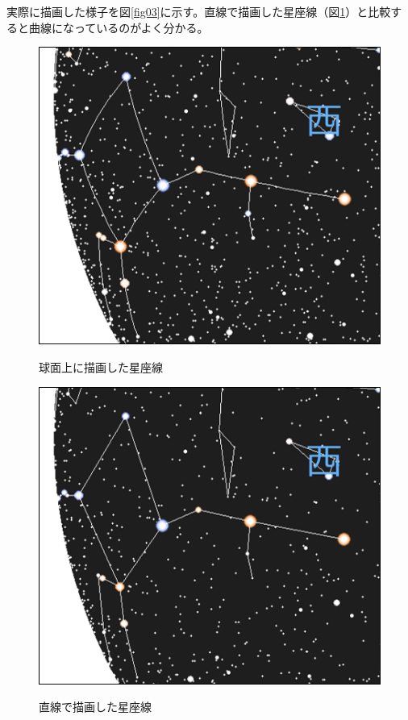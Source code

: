 \documentclass[../main]{subfiles}
\begin{document}
実際に描画した様子を図\ref{fig03}に示す。直線で描画した星座線（図\ref{fig04}）と比較すると曲線になっているのがよく分かる。
\begin{figure}[H]
  \centering
  \begin{minipage}[b]{0.45\linewidth}
    \centering
    \label{fig03}
    \includegraphics[scale=0.6]{sections/Fujisawa/image/correct_constellations.png}
    \caption{球面上に描画した星座線}
  \end{minipage}
  \begin{minipage}[b]{0.45\linewidth}
    \centering
    \label{fig04}
    \includegraphics[scale=0.6]{sections/Fujisawa/image/wrong_constellations.png}
    \caption{直線で描画した星座線}
  \end{minipage}
\end{figure}
\end{document}

